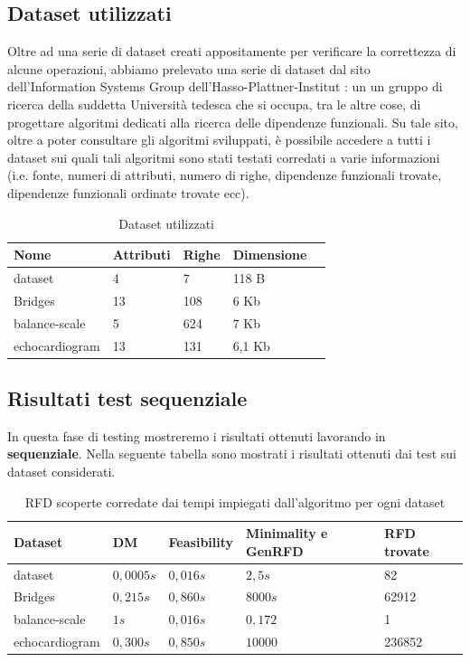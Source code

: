 \subsection{Dataset utilizzati}
Oltre ad una serie di dataset creati appositamente per verificare la correttezza di alcune operazioni, abbiamo prelevato una serie di dataset dal sito dell'Information Systems Group dell'Hasso-Plattner-Institut \cite{metanome}: un un gruppo di ricerca della suddetta Università tedesca che si occupa, tra le altre cose, di progettare algoritmi dedicati alla ricerca delle dipendenze funzionali. Su tale sito, oltre a poter consultare gli algoritmi sviluppati, è possibile accedere a tutti i dataset sui quali tali algoritmi sono stati testati corredati a varie informazioni (i.e. fonte, numeri di attributi, numero di righe, dipendenze funzionali trovate, dipendenze funzionali ordinate trovate ecc).\\
\begin{table}[H]
	\centering
	\begin{tabular}{lllll}
		Nome & Attributi & Righe & Dimensione \\
		\hline
		dataset & 4 & 7 & 118 B \\
		Bridges & 13  & 108 & 6 Kb\\
		balance-scale  & 5  & 624 & 7 Kb\\
		echocardiogram  & 13  & 131 & 6,1 Kb\\
	\end{tabular}
	\caption{Dataset utilizzati}
	\label{datasetUtilizzati}
\end{table}
\subsection{Risultati test sequenziale}
In questa fase di testing mostreremo i risultati ottenuti lavorando in \textbf{sequenziale}.
Nella seguente tabella sono mostrati i risultati ottenuti dai test sui dataset considerati.
\begin{table}[H]
	\centering
	\begin{tabular}{lllll}
		Dataset & DM & Feasibility & Minimality e GenRFD & RFD trovate \\
		\hline
		dataset& $0,0005s$ & $0,016s$ & $2,5s$ & 82 \\
		Bridges & $0,215s$  & $0,860s$ & $8000s$ & 62912 \\
		balance-scale  & $1s$  & $0,016s$ & $0,172$ & 1\\
		echocardiogram  & $0,300s$  & $0,850s$ & $10000$ & 236852\\
		\hline
	\end{tabular}
	\label{risultati}
	\caption{RFD scoperte corredate dai tempi impiegati dall'algoritmo per ogni dataset}
\end{table}

